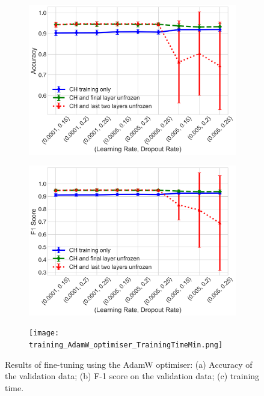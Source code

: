 \documentclass[a4paper,12pt]{article}
\newcommand{\figwidthh}{0.48\textwidth}
\begin{document}
\begin{figure}[p] 
	\begin{center}
		\begin{subfigure}[b]{\figwidthh}
			\caption{} 
			\includegraphics[width=\textwidth]{AdamW_optimiser_accuracy.png}
		\end{subfigure}
        \hfill
		\begin{subfigure}[b]{\figwidthh}
			\caption{}
			\includegraphics[width=\textwidth]{AdamW_optimiser_f1_score.png}
		\end{subfigure}
        \hfill
		\begin{subfigure}[b]{\figwidthh}
			\caption{}
			\texttt{[image: training\_AdamW\_optimiser\_TrainingTimeMin.png]}
		\end{subfigure}
	\end{center}
	\caption{Results of fine-tuning using the AdamW optimiser: (a) Accuracy of the validation data; (b) F-1 score on the validation data; (c) training time. 
	} 
	\label{fig:res_training}
\end{figure}
\end{document}
